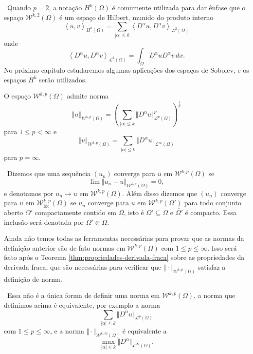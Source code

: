 \documentclass[a4paper, 11pt]{book}
\theoremstyle{definition}
\newcommand{\obs}{\noindent{\textbf{\textcolor{black}{\sffamily Observação:}}}~}
\newcommand{\cL}{\mathcal{L}}
\newcommand{\cW}{\mathcal{W}}
\newcommand{\esssup}{\mathrm{ess\,sup}\,}
\newcommand{\loc}{\mathrm{loc}}
\begin{document}
\obs Quando $p = 2$, a notação $H^{k}(\Omega)$ é comumente utilizada para dar ênfase que o espaço $\cW^{k,2}(\Omega)$ é um espaço de Hilbert, munido do produto interno
\[
    \left\langle u, v\right\rangle _{H^k(\Omega)} = \sum_{|\alpha| \leqslant k} \left\langle D^\alpha u, D^\alpha v\right\rangle _{\cL^2(\Omega)}
\]
onde
\[
    \left\langle D^\alpha u, D^\alpha v\right\rangle _{\cL^2(\Omega)} = \int_\Omega D^\alpha u D^\alpha v \,dx.
\]
No próximo capítulo estudaremos algumas aplicações dos espaços de Sobolev, e os espaços $H^k$ serão utilizados.

\begin{dbox}
    O espaço $\cW^{k,p}(\Omega)$ admite norma
    \[
        \Vert u \Vert_{\cW^{k,p}(\Omega)} = \left( \sum_{|\alpha| \leqslant k} \Vert D^\alpha u \Vert_{\cL^p(\Omega)}^p \right)^{\frac{1}{p}}
    \]
    para $1 \leqslant p < \infty$ e 
    \[
        \Vert u \Vert_{\cW^{k,p}(\Omega)} 
        = \sum_{|\alpha| \leqslant k} \Vert D^{\alpha}u \Vert_{\cL^\infty(\Omega)}
    \]
    para $p = \infty$.
\end{dbox}

\obs Dizemos que uma sequência $(u_n)$ converge para $u$ em $\cW^{k,p}(\Omega)$ se
\[
    \lim \Vert u_n - u \Vert_{\cW^{k,p}(\Omega)} = 0,
\]
e denotamos por $u_n \to u \text{ em } \cW^{k,p}(\Omega)$.
Além disso dizemos que $(u_n)$ converge para $u$ em $\cW^{k,p}_\loc(\Omega)$ se $u_n$ converge para $u$ em $\cW^{k,p}(\Omega')$ para todo conjunto aberto $\Omega'$ compactamente contido em $\Omega$, isto é $\Omega' \subseteq \Omega$ e $\overline{\Omega'}$ é compacto. Essa inclusão será denotada por $\Omega' \Subset \Omega$.

Ainda não temos todas as ferramentas necessárias para provar que as normas da definição anterior são de fato normas em $\cW^{k,p}(\Omega)$ com $1 \leqslant p \leqslant \infty$. Isso será feito após o Teorema \ref{thm:propriedades-derivada-fraca} sobre as propriedades da derivada fraca, que são necessárias para verificar que $\Vert \cdot \Vert_{\cW^{k,p}(\Omega)}$ satisfaz a definição de norma.

\obs Essa não é a única forma de definir uma norma em $\cW^{k,p}(\Omega)$, a norma que definimos acima é equivalente, por exemplo a norma
\[
    \sum_{|\alpha| \leqslant k} \Vert D^\alpha u \Vert_{\cL^p(\Omega)}
\]
com $1 \leqslant p \leqslant \infty$, e a norma $\Vert \cdot \Vert_{\cW^{k,\infty}(\Omega)}$ é equivalente a
\[
    \max_{|\alpha|\leqslant k} \Vert D^\alpha \Vert_{\cL^\infty(\Omega)}.
\]
\end{document}
